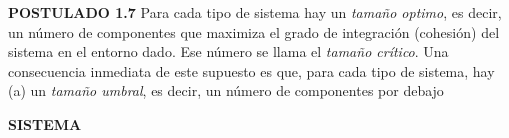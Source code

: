 {\textbf{POSTULADO 1.7} Para cada tipo de sistema hay un \textit{tamaño optimo}, es decir, un número de componentes que maximiza el grado de integración (cohesión) del sistema en el entorno dado. Ese número se llama el \textit{tamaño crítico}.
Una consecuencia inmediata de este supuesto es que, para cada tipo de sistema, hay (a) un \textit{tamaño umbral}, es decir, un número de componentes por debajo
}

\newpage
\fancyhf{}
\fancyhead[r]{\thepage}
\begin{center}
{\fontsize{13}{16}\selectfont \textbf{SISTEMA}}
\end{center}
\vspace{0.5cm}

